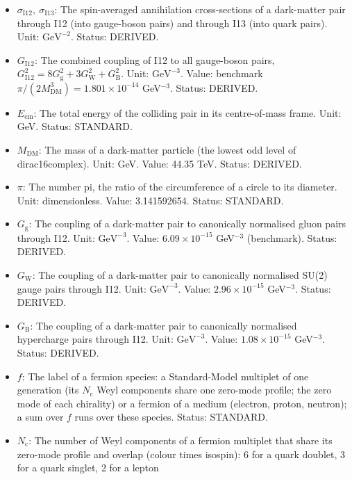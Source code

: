 \documentclass[
  10pt,
]{article}
\providecommand{\tightlist}{%
  \setlength{\itemsep}{0pt}\setlength{\parskip}{0pt}}
\begin{document}
\begin{itemize}
\tightlist
\item
  \(\sigma_{\mathrm{I12}},\ \sigma_{\mathrm{I13}}\): The spin-averaged
  annihilation cross-sections of a dark-matter pair through I12 (into
  gauge-boson pairs) and through I13 (into quark pairs). Unit:
  \(\mathrm{GeV}^{-2}\). Status: DERIVED.
\item
  \(G_{\mathrm{I12}}\): The combined coupling of I12 to all gauge-boson
  pairs,
  \(G_{\mathrm{I12}}^2 = 8G_{\mathrm{g}}^2 + 3G_{\mathrm{W}}^2 + G_{\mathrm{B}}^2\).
  Unit: \(\mathrm{GeV}^{-3}\). Value: benchmark
  \(\pi/(2M_{\mathrm{DM}}^3) = 1.801\times10^{-14}\) GeV\(^{-3}\).
  Status: DERIVED.
\item
  \(E_{\mathrm{cm}}\): The total energy of the colliding pair in its
  centre-of-mass frame. Unit: GeV. Status: STANDARD.
\item
  \(M_{\mathrm{DM}}\): The mass of a dark-matter particle (the lowest
  odd level of dirac16complex). Unit: GeV. Value: 44.35 TeV. Status:
  DERIVED.
\item
  \(\pi\): The number pi, the ratio of the circumference of a circle to
  its diameter. Unit: dimensionless. Value: 3.141592654. Status:
  STANDARD.
\item
  \(G_{\mathrm{g}}\): The coupling of a dark-matter pair to canonically
  normalised gluon pairs through I12. Unit: \(\mathrm{GeV}^{-3}\).
  Value: \(6.09\times10^{-15}\) GeV\(^{-3}\) (benchmark). Status:
  DERIVED.
\item
  \(G_{\mathrm{W}}\): The coupling of a dark-matter pair to canonically
  normalised SU(2) gauge pairs through I12. Unit: \(\mathrm{GeV}^{-3}\).
  Value: \(2.96\times10^{-15}\) GeV\(^{-3}\). Status: DERIVED.
\item
  \(G_{\mathrm{B}}\): The coupling of a dark-matter pair to canonically
  normalised hypercharge pairs through I12. Unit: \(\mathrm{GeV}^{-3}\).
  Value: \(1.08\times10^{-15}\) GeV\(^{-3}\). Status: DERIVED.
\item
  \(f\): The label of a fermion species: a Standard-Model multiplet of
  one generation (its \(N_{\mathrm{c}}\) Weyl components share one
  zero-mode profile; the zero mode of each chirality) or a fermion of a
  medium (electron, proton, neutron); a sum over \(f\) runs over these
  species. Status: STANDARD.
\item
  \(N_{\mathrm{c}}\): The number of Weyl components of a fermion
  multiplet that share its zero-mode profile and overlap (colour times
  isospin): 6 for a quark doublet, 3 for a quark singlet, 2 for a lepton

\end{itemize}
\end{document}
